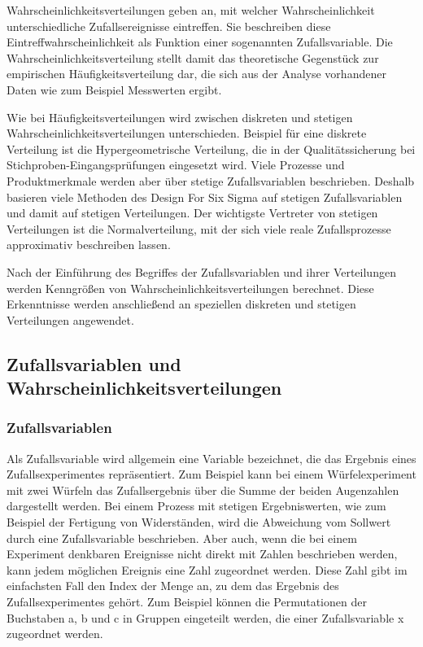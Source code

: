 \noindent Wahrscheinlichkeitsverteilungen geben an, mit welcher Wahrscheinlichkeit unterschiedliche Zufallsereignisse eintreffen. Sie beschreiben diese Eintreffwahrscheinlichkeit als Funktion einer sogenannten Zufallsvariable. Die Wahrscheinlichkeitsverteilung stellt damit das theoretische Gegenst\"{u}ck zur empirischen H\"{a}ufigkeitsverteilung dar, die sich aus der Analyse vorhandener Daten wie zum Beispiel Messwerten ergibt.\newline

\noindent Wie bei H\"{a}ufigkeitsverteilungen wird zwischen diskreten und stetigen Wahrscheinlichkeitsverteilungen unterschieden. Beispiel f\"{u}r eine diskrete Verteilung ist die Hypergeometrische Verteilung, die in der Qualit\"{a}tssicherung bei Stichproben-Eingangspr\"{u}fungen eingesetzt wird. Viele Prozesse und Produktmerkmale werden aber \"{u}ber stetige Zufallsvariablen beschrieben. Deshalb basieren viele Methoden des Design For Six Sigma auf stetigen Zufallsvariablen und damit auf stetigen Verteilungen. Der wichtigste Vertreter von stetigen Verteilungen ist die Normalverteilung, mit der sich viele reale Zufallsprozesse approximativ beschreiben lassen.\newline

\noindent Nach der Einf\"{u}hrung des Begriffes der Zufallsvariablen und ihrer Verteilungen werden Kenngr\"{o}{\ss}en von Wahrscheinlichkeitsverteilungen berechnet. Diese Erkenntnisse werden anschlie{\ss}end an speziellen diskreten und stetigen Verteilungen angewendet.\newline

\subsection{Zufallsvariablen und Wahrscheinlichkeitsverteilungen}

\subsubsection{Zufallsvariablen}

\noindent Als Zufallsvariable wird allgemein eine Variable bezeichnet, die das Ergebnis eines Zufallsexperimentes repr\"{a}sentiert. Zum Beispiel kann bei einem W\"{u}rfelexperiment mit zwei W\"{u}rfeln das Zufallsergebnis \"{u}ber die Summe der beiden Augenzahlen dargestellt werden. Bei einem Prozess mit stetigen Ergebniswerten, wie zum Beispiel der Fertigung von Widerst\"{a}nden, wird die Abweichung vom Sollwert durch eine Zufallsvariable beschrieben. Aber auch, wenn die bei einem Experiment denkbaren Ereignisse nicht direkt mit Zahlen beschrieben werden, kann jedem m\"{o}glichen Ereignis eine Zahl zugeordnet werden. Diese Zahl gibt im einfachsten Fall den Index der Menge an, zu dem das Ergebnis des Zufallsexperimentes geh\"{o}rt. Zum Beispiel k\"{o}nnen die Permutationen der Buchstaben a, b und c in Gruppen eingeteilt werden, die einer Zufallsvariable x zugeordnet werden.

